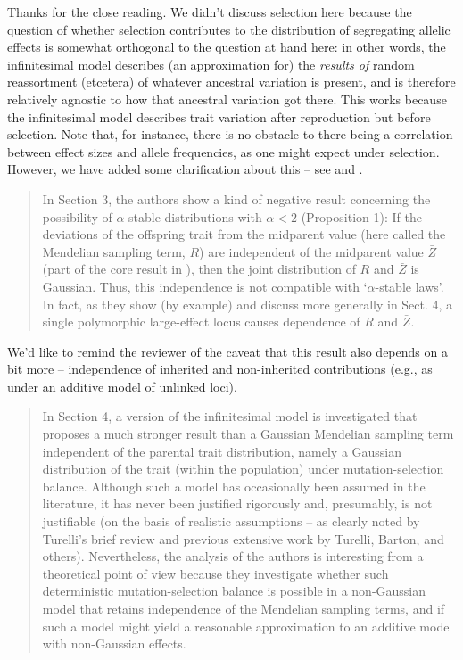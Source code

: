 Thanks for the close reading.
We didn't discuss selection here because the question of whether selection contributes
to the distribution of segregating allelic effects
is somewhat orthogonal to the question at hand here:
in other words, the infinitesimal model describes (an approximation for)
the \emph{results of} random reassortment (etcetera) of whatever ancestral variation is present,
and is therefore relatively agnostic to how that ancestral variation got there.
This works because the infinitesimal model describes trait variation after reproduction
but before selection.
Note that, for instance, there is no obstacle to there being a correlation between effect sizes and allele frequencies,
as one might expect under selection.
However, we have added some clarification about this --
see  and .

\begin{quote}
In Section 3, the authors show a kind of negative result concerning the possibility of $\alpha$-stable 
distributions with $\alpha < 2$ (Proposition 1): If the deviations of the offspring trait
from the midparent value (here called the Mendelian sampling term, $R$) are independent
of the midparent value $\bar Z$ (part of the core result in \citet{barton2017infinitesimal}), then the joint
distribution of $R$ and $\bar Z$ is Gaussian. Thus, this independence is not compatible with ‘$\alpha$-stable 
laws’. In fact, as they show (by example) and discuss more generally in Sect. 4, a
single polymorphic large-effect locus causes dependence of $R$ and $\bar Z$.
\end{quote}

We'd like to remind the reviewer of the caveat that this result
also depends on a bit more -- independence of inherited and non-inherited contributions
(e.g., as under an additive model of unlinked loci).

\begin{quote}
In Section 4, a version of the infinitesimal model is investigated that proposes a much
stronger result than a Gaussian Mendelian sampling term independent of the parental
trait distribution, namely a Gaussian distribution of the trait (within the population)
under mutation-selection balance. Although such a model has occasionally been assumed
in the literature, it has never been justified rigorously and, presumably, is not justifiable
(on the basis of realistic assumptions – as clearly noted by Turelli’s brief review and
previous extensive work by Turelli, Barton, and others). Nevertheless, the analysis of the
authors is interesting from a theoretical point of view because they investigate whether
such deterministic mutation-selection balance is possible in a non-Gaussian model that
retains independence of the Mendelian sampling terms, and if such a model might yield a
reasonable approximation to an additive model with non-Gaussian effects.
\end{quote}

